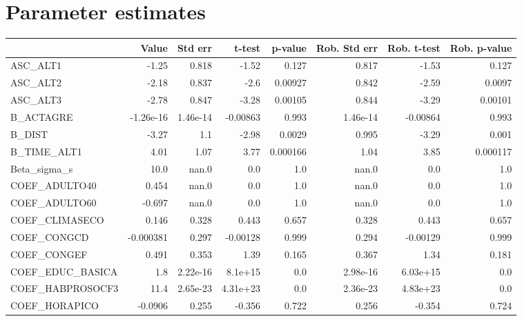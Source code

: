\section{Parameter estimates}
\begin{tabular}{lrrrrrrr}
\toprule
{} &     Value &  Std err &    t-test &  p-value &  Rob. Std err &  Rob. t-test &  Rob. p-value \\
\midrule
ASC\_ALT1         &     -1.25 &    0.818 &     -1.52 &    0.127 &         0.817 &        -1.53 &         0.127 \\
ASC\_ALT2         &     -2.18 &    0.837 &      -2.6 &  0.00927 &         0.842 &        -2.59 &        0.0097 \\
ASC\_ALT3         &     -2.78 &    0.847 &     -3.28 &  0.00105 &         0.844 &        -3.29 &       0.00101 \\
B\_ACTAGRE        & -1.26e-16 & 1.46e-14 &  -0.00863 &    0.993 &      1.46e-14 &     -0.00864 &         0.993 \\
B\_DIST           &     -3.27 &      1.1 &     -2.98 &   0.0029 &         0.995 &        -3.29 &         0.001 \\
B\_TIME\_ALT1      &      4.01 &     1.07 &      3.77 & 0.000166 &          1.04 &         3.85 &      0.000117 \\
Beta\_sigma\_s     &      10.0 &    nan.0 &       0.0 &      1.0 &         nan.0 &          0.0 &           1.0 \\
COEF\_ADULTO40    &     0.454 &    nan.0 &       0.0 &      1.0 &         nan.0 &          0.0 &           1.0 \\
COEF\_ADULTO60    &    -0.697 &    nan.0 &       0.0 &      1.0 &         nan.0 &          0.0 &           1.0 \\
COEF\_CLIMASECO   &     0.146 &    0.328 &     0.443 &    0.657 &         0.328 &        0.443 &         0.657 \\
COEF\_CONGCD      & -0.000381 &    0.297 &  -0.00128 &    0.999 &         0.294 &     -0.00129 &         0.999 \\
COEF\_CONGEF      &     0.491 &    0.353 &      1.39 &    0.165 &         0.367 &         1.34 &         0.181 \\
COEF\_EDUC\_BASICA &       1.8 & 2.22e-16 &   8.1e+15 &      0.0 &      2.98e-16 &     6.03e+15 &           0.0 \\
COEF\_HABPROSOCF3 &      11.4 & 2.65e-23 &  4.31e+23 &      0.0 &      2.36e-23 &     4.83e+23 &           0.0 \\
COEF\_HORAPICO    &   -0.0906 &    0.255 &    -0.356 &    0.722 &         0.256 &       -0.354 &         0.724 \\

\end{tabular}

